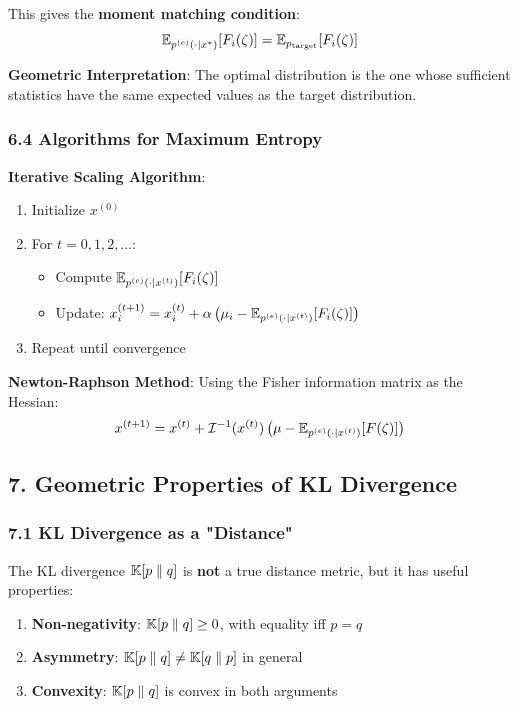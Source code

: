 \documentclass{amsart}
\let\originalmathbb\mathbb
\renewcommand{\mathbb}[1]{%
    \ifstrequal{#1}{1}{\mathbbm{#1}}{\originalmathbb{#1}}%
}
\theoremstyle{plain}
\theoremstyle{definition}
\theoremstyle{remark}
\begin{document}
This gives the \textbf{moment matching condition}:
\[
\mathbb{E}_{p^{(e)}(\cdot \mid x^*)}[F_i(\zeta)] = \mathbb{E}_{p_{\text{target}}}[F_i(\zeta)]
\]

\textbf{Geometric Interpretation}: The optimal distribution is the one whose sufficient statistics have the same expected values as the target distribution.

\subsubsection{6.4 Algorithms for Maximum Entropy}

\textbf{Iterative Scaling Algorithm}:

\begin{enumerate}
	\item Initialize $x^{(0)}$
	\item For $t = 0, 1, 2, \ldots$:
	\begin{itemize}
		\item Compute $\mathbb{E}_{p^{(e)}(\cdot \mid x^{(t)})}[F_i(\zeta)]$
		\item Update: $x^{(t+1)}_i = x^{(t)}_i + \alpha \left(\mu_i - \mathbb{E}_{p^{(e)}(\cdot \mid x^{(t)})}[F_i(\zeta)]\right)$
	\end{itemize}
	\item Repeat until convergence
\end{enumerate}

\textbf{Newton-Raphson Method}:
Using the Fisher information matrix as the Hessian:
\[
x^{(t+1)} = x^{(t)} + \mathcal{I}^{-1}(x^{(t)}) \left(\mu - \mathbb{E}_{p^{(e)}(\cdot \mid x^{(t)})}[F(\zeta)]\right)
\]

\subsection{7. Geometric Properties of KL Divergence}

\subsubsection{7.1 KL Divergence as a "Distance"}

The KL divergence $\mathbb{K}[p \parallel q]$ is \textbf{not} a true distance metric, but it has useful properties:

\begin{enumerate}
	\item \textbf{Non-negativity}: $\mathbb{K}[p \parallel q] \geq 0$, with equality iff $p = q$
	\item \textbf{Asymmetry}: $\mathbb{K}[p \parallel q] \neq \mathbb{K}[q \parallel p]$ in general
	\item \textbf{Convexity}: $\mathbb{K}[p \parallel q]$ is convex in both arguments
\end{enumerate}
\end{document}
